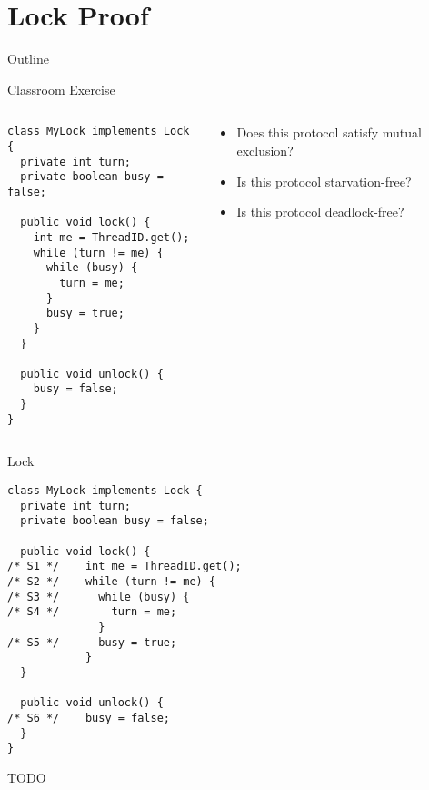 \section{Lock Proof}

\begin{frame}{Outline}
  \tableofcontents[current]
\end{frame}

\begin{frame}[fragile]{Classroom Exercise}
  \begin{columns}[c]
    \begin{column}{0.50\textwidth}
\begin{lstlisting}[basicstyle=\fontsize{9}{11}\selectfont\ttfamily]
class MyLock implements Lock {
  private int turn;
  private boolean busy = false;

  public void lock() {
    int me = ThreadID.get();
    while (turn != me) {
      while (busy) {
        turn = me;
      }
      busy = true;
    }
  }

  public void unlock() {
    busy = false;
  }
}
\end{lstlisting}
    \end{column}
    \begin{column}{0.50\textwidth}
      \begin{itemize}
      \item Does this protocol satisfy mutual exclusion?
      \item Is this protocol starvation-free?
      \item Is this protocol deadlock-free?
  \end{itemize}
    \end{column}
  \end{columns}
\end{frame}

\begin{frame}{Lock}
\begin{lstlisting}
class MyLock implements Lock {
  private int turn;
  private boolean busy = false;

  public void lock() {
/* S1 */    int me = ThreadID.get();
/* S2 */    while (turn != me) {
/* S3 */      while (busy) {
/* S4 */        turn = me;
              }
/* S5 */      busy = true;
            }
  }

  public void unlock() {
/* S6 */    busy = false;
  }
}
\end{lstlisting}
\end{frame}

\begin{frame}{TODO}
  
\end{frame}

